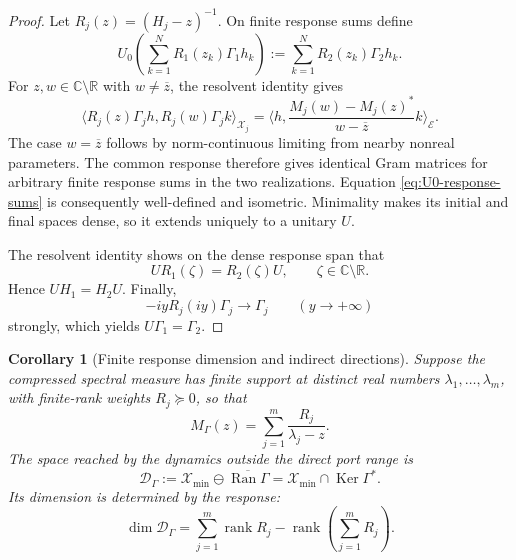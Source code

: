 \documentclass[11pt,reqno]{scrartcl}
\newcommand{\CC}{\mathbb C}
\newcommand{\RR}{\mathbb R}
\newcommand{\inner}[2]{\langle #1,#2\rangle}
\DeclareMathOperator{\Ran}{Ran}
\DeclareMathOperator{\Ker}{Ker}
\newcommand{\scrX}{\mathscr X}
\newcommand{\scrE}{\mathscr E}
\newcommand{\Mresp}{M_{\Gamma}}
\newcommand{\Hmin}{\mathscr X_{\min}}
\theoremstyle{plain}
\newtheorem{corollary}[corollary]{Corollary}
\theoremstyle{definition}
\theoremstyle{remark}
\begin{document}
\begin{proof}
Let \(R_j(z)=(H_j-z)^{-1}\).  On finite response sums define
\begin{equation}
  U_0\left(\sum_{k=1}^N R_1(z_k)\Gamma_1h_k\right)
  :=\sum_{k=1}^N R_2(z_k)\Gamma_2h_k.
  \label{eq:U0-response-sums}
\end{equation}
For \(z,w\in\CC\setminus\RR\) with \(w\ne\overline z\), the
resolvent identity gives
\begin{equation}
  \inner{R_j(z)\Gamma_jh}{R_j(w)\Gamma_jk}_{\scrX_j}
  =\inner{h}{
    \frac{M_j(w)-M_j(z)^*}{w-\overline z}
    k}_{\scrE}.
  \label{eq:minimal-Gram-formula}
\end{equation}
The case \(w=\overline z\) follows by norm-continuous limiting from nearby
nonreal parameters.  The common response therefore gives identical Gram matrices for arbitrary
finite response sums in the two realizations.  Equation \eqref{eq:U0-response-sums} is consequently
well-defined and isometric.  Minimality makes its initial and final spaces
dense, so it extends uniquely to a unitary \(U\).

The resolvent identity shows on the dense response span that
\begin{equation}
  UR_1(\zeta)=R_2(\zeta)U,
  \qquad \zeta\in\CC\setminus\RR.
\end{equation}
Hence \(UH_1=H_2U\).  Finally,
\begin{equation}
  -iyR_j(iy)\Gamma_j\longrightarrow\Gamma_j
  \qquad (y\to+\infty)
\end{equation}
strongly, which yields \(U\Gamma_1=\Gamma_2\).
\end{proof}

\begin{corollary}[Finite response dimension and indirect directions]
\label{cor:finite-response-defect}
Suppose the compressed spectral measure has finite support at distinct
real numbers \(\lambda_1,\ldots,\lambda_m\), with finite-rank weights
\(R_j\succeq0\), so that
\begin{equation}
  \Mresp(z)=\sum_{j=1}^{m}\frac{R_j}{\lambda_j-z}.
  \label{eq:finite-response-weights}
\end{equation}
The space reached by the dynamics outside the direct port range is
\begin{equation}
  \mathcal D_\Gamma
  :=\Hmin\ominus\overline{\Ran\Gamma}
  =\Hmin\cap\Ker\Gamma^*.
  \label{eq:indirect-response-space}
\end{equation}
Its dimension is determined by the response:
\begin{equation}
  \boxed{
  \dim\mathcal D_\Gamma
  =\sum_{j=1}^{m}\operatorname{rank}R_j
   -\operatorname{rank}\!\left(\sum_{j=1}^{m}R_j\right).}
  \label{eq:finite-response-defect-count}
\end{equation}
\end{corollary}
\end{document}
